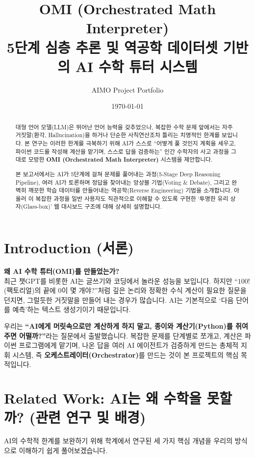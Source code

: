 \documentclass[11pt,a4paper]{article}
\title{OMI (Orchestrated Math Interpreter) \\ \Large 5단계 심층 추론 및 역공학 데이터셋 기반의 AI 수학 튜터 시스템}
\author{AIMO Project Portfolio}
\date{\today}
\begin{document}
\maketitle

\begin{abstract}
대형 언어 모델(LLM)은 뛰어난 언어 능력을 갖추었으나, 복잡한 수학 문제 앞에서는 자주 거짓말(환각, Hallucination)을 하거나 단순한 사칙연산조차 틀리는 치명적인 한계를 보입니다. 본 연구는 이러한 한계를 극복하기 위해 AI가 스스로 ``어떻게 풀 것인지 계획을 세우고, 파이썬 코드를 작성해 계산을 맡기며, 스스로 답을 검증하는'' 인간 수학자의 사고 과정을 그대로 모방한 \textbf{OMI (Orchestrated Math Interpreter)} 시스템을 제안합니다.

본 보고서에서는 AI가 5단계에 걸쳐 문제를 풀어내는 과정(5-Stage Deep Reasoning Pipeline), 여러 AI가 토론하며 정답을 찾아내는 앙상블 기법(Voting \& Debate), 그리고 완벽히 깨끗한 학습 데이터를 만들어내는 역공학(Reverse Engineering) 기법을 소개합니다. 아울러 이 복잡한 과정을 일반 사용자도 직관적으로 이해할 수 있도록 구현한 `투명한 유리 상자(Glass-box)' 웹 대시보드 구조에 대해 상세히 설명합니다.
\end{abstract}

\tableofcontents
\newpage

\section{Introduction (서론)}
\textbf{왜 AI 수학 튜터(OMI)를 만들었는가?} \\
최근 챗GPT를 비롯한 AI는 글쓰기와 코딩에서 놀라운 성능을 보입니다. 하지만 ``$100!$ (팩토리얼)의 끝에 0이 몇 개야?''처럼 깊은 논리와 정확한 수식 계산이 필요한 질문을 던지면, 그럴듯한 거짓말을 만들어 내는 경우가 많습니다. AI는 기본적으로 `다음 단어를 예측'하는 텍스트 생성기이기 때문입니다.

우리는 \textbf{``AI에게 머릿속으로만 계산하게 하지 말고, 종이와 계산기(Python)를 쥐여주면 어떨까?''}라는 질문에서 출발했습니다. 복잡한 문제를 단계별로 쪼개고, 계산은 파이썬 프로그램에게 맡기며, 나온 답을 여러 AI 에이전트가 검증하게 만드는 총체적 지휘 시스템, 즉 \textbf{오케스트레이터(Orchestrator)}를 만드는 것이 본 프로젝트의 핵심 목적입니다.

\section{Related Work: AI는 왜 수학을 못할까? (관련 연구 및 배경)}
AI의 수학적 한계를 보완하기 위해 학계에서 연구된 세 가지 핵심 개념을 우리의 방식으로 이해하기 쉽게 풀어보겠습니다.
\end{document}

